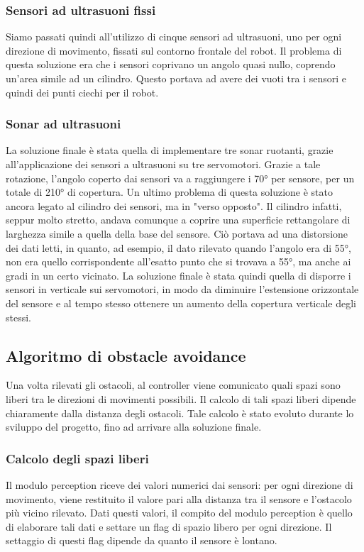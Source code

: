 \documentclass[]{article}
\begin{document}
\subsubsection{Sensori ad ultrasuoni fissi}
Siamo passati quindi all'utilizzo di cinque sensori ad ultrasuoni, uno per ogni direzione di movimento, fissati sul contorno frontale del robot. Il problema di questa soluzione era che i sensori coprivano un angolo quasi nullo, coprendo un'area simile ad un cilindro. Questo portava ad avere dei vuoti tra i sensori e quindi dei punti ciechi per il robot.

\subsubsection{Sonar ad ultrasuoni}
La soluzione finale è stata quella di implementare tre sonar ruotanti, grazie all'applicazione dei sensori a ultrasuoni su tre servomotori. Grazie a tale rotazione, l'angolo coperto dai sensori va a raggiungere i 70° per sensore, per un totale di 210° di copertura. Un ultimo problema di questa soluzione è stato ancora legato al cilindro dei sensori, ma in "verso opposto". Il cilindro infatti, seppur molto stretto, andava comunque a coprire una superficie rettangolare di larghezza simile a quella della base del sensore. Ciò portava ad una distorsione dei dati letti, in quanto, ad esempio, il dato rilevato quando l'angolo era di 55°, non era quello corrispondente all'esatto punto che si trovava a 55°, ma anche ai gradi in un certo vicinato. La soluzione finale è stata quindi quella di disporre i sensori in verticale sui servomotori, in modo da diminuire l'estensione orizzontale del sensore e al tempo stesso ottenere un aumento della copertura verticale degli stessi.

\subsection{Algoritmo di obstacle avoidance}
Una volta rilevati gli ostacoli, al controller viene comunicato quali spazi sono liberi tra le direzioni di movimenti possibili. Il calcolo di tali spazi liberi dipende chiaramente dalla distanza degli ostacoli. Tale calcolo è stato evoluto durante lo sviluppo del progetto, fino ad arrivare alla soluzione finale.



\subsubsection{Calcolo degli spazi liberi}
Il modulo perception riceve dei valori numerici dai sensori: per ogni direzione di movimento, viene restituito il valore pari alla distanza tra il sensore e l'ostacolo più vicino rilevato. Dati questi valori, il compito del modulo perception è quello di elaborare tali dati e settare un flag di spazio libero per ogni direzione. Il settaggio di questi flag dipende da quanto il sensore è lontano.
\end{document}
